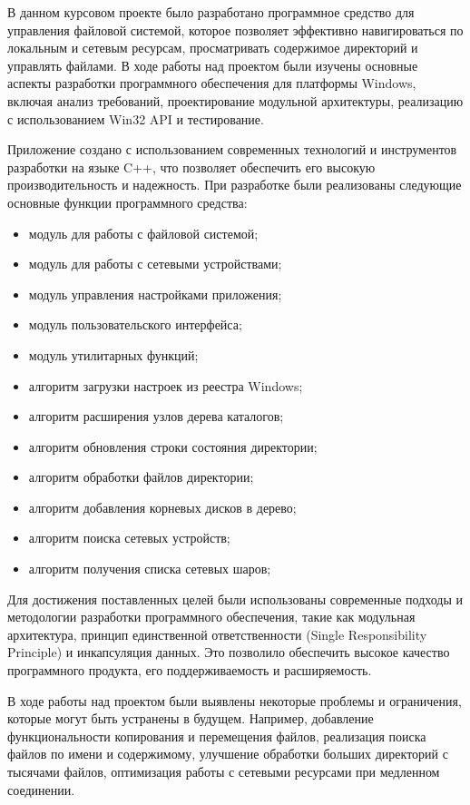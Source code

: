 \label{sec:outro}

В данном курсовом проекте было разработано программное средство для управления файловой системой, которое позволяет эффективно навигироваться по локальным и сетевым ресурсам, просматривать содержимое директорий и управлять файлами. В ходе работы над проектом были изучены основные аспекты разработки программного обеспечения для платформы Windows, включая анализ требований, проектирование модульной архитектуры, реализацию с использованием Win32 API и тестирование.

Приложение создано с использованием современных технологий и инструментов разработки на языке C++, что позволяет обеспечить его высокую производительность и надежность. При разработке были реализованы следующие основные функции программного средства:

\begin{itemize}
    \item модуль для работы с файловой системой;
    \item модуль для работы с сетевыми устройствами;
    \item модуль управления настройками приложения;
    \item модуль пользовательского интерфейса;
    \item модуль утилитарных функций;
    \item алгоритм загрузки настроек из реестра Windows;
    \item алгоритм расширения узлов дерева каталогов;
    \item алгоритм обновления строки состояния директории;
    \item алгоритм обработки файлов директории;
    \item алгоритм добавления корневых дисков в дерево;
    \item алгоритм поиска сетевых устройств;
    \item алгоритм получения списка сетевых шаров;
\end{itemize}

Для достижения поставленных целей были использованы современные подходы и методологии разработки программного обеспечения, такие как модульная архитектура, принцип единственной ответственности (Single Responsibility Principle) и инкапсуляция данных. Это позволило обеспечить высокое качество программного продукта, его поддерживаемость и расширяемость.

В ходе работы над проектом были выявлены некоторые проблемы и ограничения, которые могут быть устранены в будущем. Например, добавление функциональности копирования и перемещения файлов, реализация поиска файлов по имени и содержимому, улучшение обработки больших директорий с тысячами файлов, оптимизация работы с сетевыми ресурсами при медленном соединении.